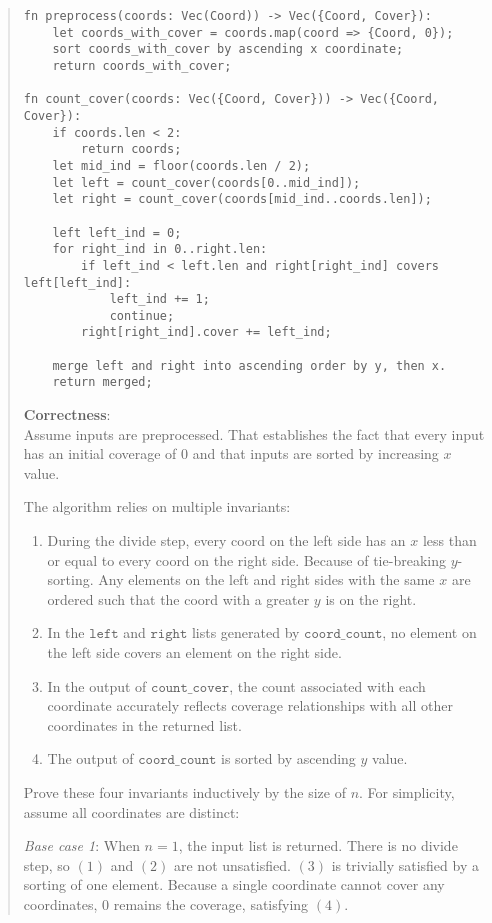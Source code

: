\documentclass[11pt]{article}
\newcommand{\code}[1]{$\texttt{#1}$}
\begin{document}
\begin{enumerate}
\begin{enumerate}
\begin{quote}
\begin{verbatim}
fn preprocess(coords: Vec(Coord)) -> Vec({Coord, Cover}):
    let coords_with_cover = coords.map(coord => {Coord, 0});
    sort coords_with_cover by ascending x coordinate;
    return coords_with_cover;

fn count_cover(coords: Vec({Coord, Cover})) -> Vec({Coord, Cover}):
    if coords.len < 2:
        return coords;
    let mid_ind = floor(coords.len / 2);
    let left = count_cover(coords[0..mid_ind]);
    let right = count_cover(coords[mid_ind..coords.len]);

    left left_ind = 0;
    for right_ind in 0..right.len:
        if left_ind < left.len and right[right_ind] covers left[left_ind]:
            left_ind += 1;
            continue;
        right[right_ind].cover += left_ind;

    merge left and right into ascending order by y, then x.
    return merged;
\end{verbatim}
    

\textbf{Correctness}: \\
Assume inputs are preprocessed. That establishes the fact that every input has an initial coverage of $0$ and that inputs are sorted by increasing $x$ value.

\medskip
The algorithm relies on multiple invariants:
\begin{enumerate}[label=\arabic*.]
 \item During the divide step, every coord on the left side has an $x$ less than or equal to every coord on the right side. Because of tie-breaking $y$-sorting. Any elements on the left and right sides with the same $x$ are ordered such that the coord with a greater $y$ is on the right.
 \item In the \code{left} and \code{right} lists generated by \code{coord\_count}, no element on the left side covers an element on the right side.
 \item In the output of \code{count\_cover}, the count associated with each coordinate accurately reflects coverage relationships with all other coordinates in the returned list.
 \item The output of \code{coord\_count} is sorted by ascending $y$ value.
\end{enumerate}

\medskip
Prove these four invariants inductively by the size of $n$. For simplicity, assume all coordinates are distinct:

\medskip
\textit{Base case 1}: When $n = 1$, the input list is returned. There is no divide step, so $(1)$ and $(2)$ are not unsatisfied. $(3)$ is trivially satisfied by a sorting of one element. Because a single coordinate cannot cover any coordinates, $0$ remains the coverage, satisfying $(4)$.


\end{quote}
\end{enumerate}
\end{enumerate}
\end{document}
